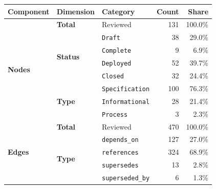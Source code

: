 {%
    \setlength{\abovetopsep}{0pt}%
    \setlength{\belowbottomsep}{0pt}%
    \setlength{\aboverulesep}{0pt}%
    \setlength{\belowrulesep}{0pt}%
    \setlength{\tabcolsep}{8pt}%
    \renewcommand{\arraystretch}{1.15}%
    \begin{tabular}{l l|l r r}
        \toprule
        \textbf{Component} & \textbf{Dimension} & \textbf{Category} & \textbf{Count} & \textbf{Share} \\
        \midrule%
        \multirow{8}{*}{\textbf{Nodes}} & \textbf{Total} & Reviewed & 131 & 100.0\% \\
        \cmidrule(lr){2-5}%
         & \multirow{4}{*}{\textbf{Status}} & \texttt{Draft} & 38 & 29.0\% \\
         &  & \texttt{Complete} & 9 & 6.9\% \\
         &  & \texttt{Deployed} & 52 & 39.7\% \\
         &  & \texttt{Closed} & 32 & 24.4\% \\
        \cmidrule(lr){2-5}%
         & \multirow{3}{*}{\textbf{Type}} & \texttt{Specification} & 100 & 76.3\% \\
         &  & \texttt{Informational} & 28 & 21.4\% \\
         &  & \texttt{Process} & 3 & 2.3\% \\
        \midrule%
        \multirow{5}{*}{\textbf{Edges}} & \textbf{Total} & Reviewed & 470 & 100.0\% \\
        \cmidrule(lr){2-5}%
         & \multirow{4}{*}{\textbf{Type}} & \texttt{depends\_on} & 127 & 27.0\% \\
         &  & \texttt{references} & 324 & 68.9\% \\
         &  & \texttt{supersedes} & 13 & 2.8\% \\
         &  & \texttt{superseded\_by} & 6 & 1.3\% \\
        \bottomrule
    \end{tabular}%
}
